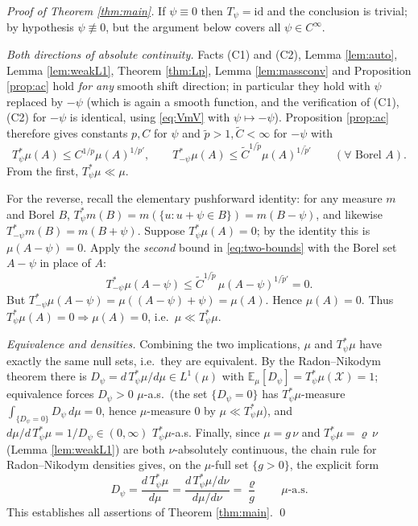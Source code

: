 \documentclass[12pt]{article}
\newcommand{\bE}{\mathbb{E}}
\theoremstyle{plain}
\theoremstyle{definition}
\begin{document}
\begin{proof}[Proof of Theorem \ref{thm:main}]
If $\psi\equiv0$ then $T_\psi=\mathrm{id}$ and the conclusion is trivial; by hypothesis
$\psi\not\equiv0$, but the argument below covers all $\psi\in C^\infty$.

\emph{Both directions of absolute continuity.} Facts (C1) and (C2), Lemma
\ref{lem:auto}, Lemma \ref{lem:weakL1}, Theorem \ref{thm:Lp}, Lemma \ref{lem:massconv}
and Proposition \ref{prop:ac} hold \emph{for any} smooth shift direction; in particular
they hold with $\psi$ replaced by $-\psi$ (which is again a smooth function, and the
verification of (C1),(C2) for $-\psi$ is identical, using \eqref{eq:VmV} with
$\psi\mapsto-\psi$). Proposition \ref{prop:ac} therefore gives constants
$p,C$ for $\psi$ and $\tilde p>1,\tilde C<\infty$ for $-\psi$ with
\begin{equation}\label{eq:two-bounds}
T_\psi^\ast\mu(A)\le C^{1/p}\mu(A)^{1/p'},\qquad
T_{-\psi}^\ast\mu(A)\le \tilde C^{1/\tilde p}\mu(A)^{1/\tilde p'}
\qquad(\forall\text{ Borel }A).
\end{equation}
From the first, $T_\psi^\ast\mu\ll\mu$.

For the reverse, recall the elementary pushforward identity: for any measure $m$ and
Borel $B$, $T_\psi^\ast m(B)=m(\{u:u+\psi\in B\})=m(B-\psi)$, and likewise
$T_{-\psi}^\ast m(B)=m(B+\psi)$. Suppose $T_\psi^\ast\mu(A)=0$; by the identity this is
$\mu(A-\psi)=0$. Apply the \emph{second} bound in \eqref{eq:two-bounds} with the Borel
set $A-\psi$ in place of $A$:
\[
T_{-\psi}^\ast\mu(A-\psi)\le \tilde C^{1/\tilde p}\,\mu(A-\psi)^{1/\tilde p'}=0 .
\]
But $T_{-\psi}^\ast\mu(A-\psi)=\mu((A-\psi)+\psi)=\mu(A)$. Hence $\mu(A)=0$. Thus
$T_\psi^\ast\mu(A)=0\Rightarrow\mu(A)=0$, i.e.\ $\mu\ll T_\psi^\ast\mu$.

\emph{Equivalence and densities.} Combining the two implications, $\mu$ and
$T_\psi^\ast\mu$ have exactly the same null sets, i.e.\ they are equivalent. By the
Radon--Nikodym theorem there is $D_\psi=d\,T_\psi^\ast\mu/d\mu\in L^1(\mu)$ with
$\bE_\mu[D_\psi]=T_\psi^\ast\mu(\mathcal X)=1$; equivalence forces $D_\psi>0$
$\mu$-a.s.\ (the set $\{D_\psi=0\}$ has $T_\psi^\ast\mu$-measure
$\int_{\{D_\psi=0\}}D_\psi\,d\mu=0$, hence $\mu$-measure $0$ by $\mu\ll T_\psi^\ast\mu$),
and $d\mu/d\,T_\psi^\ast\mu=1/D_\psi\in(0,\infty)$ $T_\psi^\ast\mu$-a.s. Finally, since
$\mu=g\,\nu$ and $T_\psi^\ast\mu=\varrho\,\nu$ (Lemma \ref{lem:weakL1}) are both
$\nu$-absolutely continuous, the chain rule for Radon--Nikodym densities gives, on the
$\mu$-full set $\{g>0\}$, the explicit form
\[
D_\psi=\frac{d\,T_\psi^\ast\mu}{d\mu}=\frac{d\,T_\psi^\ast\mu/d\nu}{d\mu/d\nu}=\frac{\varrho}{g}
\qquad\mu\text{-a.s.}
\]
This establishes all assertions of Theorem \ref{thm:main}. \qed
\end{proof}
\end{document}
